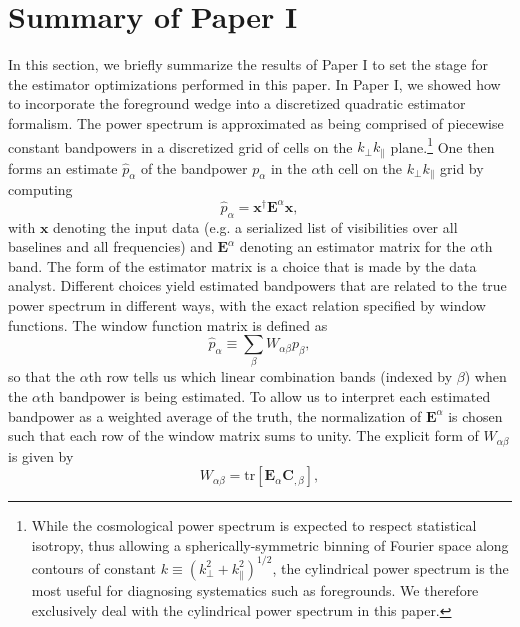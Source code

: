 \documentclass[twocolumn,aps,prd,nofootinbib,showpacs]{revtex4-1}
\begin{document}
\section{Summary of Paper I}
\label{sec:PaperI}

In this section, we briefly summarize the results of Paper I to set the stage for the estimator optimizations performed in this paper.  In Paper I, we showed how to incorporate the foreground wedge into a discretized quadratic estimator formalism.  The power spectrum is approximated as being comprised of piecewise constant bandpowers in a discretized grid of cells on the $k_\perp k_\parallel$ plane.\footnote{While the cosmological power spectrum is expected to respect statistical isotropy, thus allowing a spherically-symmetric binning of Fourier space along contours of constant $k\equiv (k_\perp^2 + k_\parallel^2)^{1/2}$, the cylindrical power spectrum is the most useful for diagnosing systematics such as foregrounds.  We therefore exclusively deal with the cylindrical power spectrum in this paper.}  One then forms an estimate $\widehat{p}_\alpha$ of the bandpower $p_\alpha$ in the $\alpha$th cell on the $k_\perp k_\parallel$ grid by computing
\begin{equation}
\label{eq:GenericEst}
\widehat{p}_\alpha = \mathbf{x}^\dagger \mathbf{E}^\alpha \mathbf{x},
\end{equation}
with $\mathbf{x}$ denoting the input data (e.g. a serialized list of visibilities over all baselines and all frequencies) and $\mathbf{E}^\alpha$ denoting an estimator matrix for the $\alpha$th band.  The form of the estimator matrix is a choice that is made by the data analyst.  Different choices yield estimated bandpowers that are related to the true power spectrum in different ways, with the exact relation specified by window functions.  The window function matrix is defined as
\begin{equation}
\label{eq:WindDef}
\widehat{p}_\alpha \equiv \sum_\beta W_{\alpha \beta} p_\beta,
\end{equation}
so that the $\alpha$th row tells us which linear combination bands (indexed by $\beta$) when the $\alpha$th bandpower is being estimated.  To allow us to interpret each estimated bandpower as a weighted average of the truth, the normalization of $\mathbf{E}^\alpha$ is chosen such that each row of the window matrix sums to unity.  The explicit form of $W_{\alpha \beta}$ is given by
\begin{equation}
\label{eq:WindExplicitForm}
W_{\alpha \beta} = \textrm{tr} \left[ \mathbf{E}_\alpha \mathbf{C}_{,\beta} \right],
\end{equation}
\end{document}
